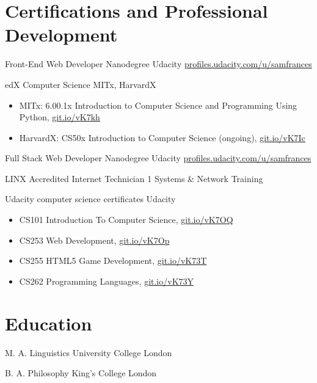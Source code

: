 \documentclass[10pt,a4paper,sans]{moderncv} %
\begin{document}

\section{Certifications and Professional Development}

    {Front-End Web Developer Nanodegree}
    {Udacity}{}
    { \href{ https://profiles.udacity.com/u/samfrances }{ profiles.udacity.com/u/samfrances } }
    {}

    {edX Computer Science}
    {MITx, HarvardX}{}
    {}
    {        \begin{itemize}
            \item{ MITx: 6.00.1x Introduction to Computer Science and Programming Using Python, \href{ https://git.io/vK7kh }{ git.io/vK7kh } }
            \item{ HarvardX: CS50x Introduction to Computer Science (ongoing), \href{ https://git.io/vK7Ic }{ git.io/vK7Ic } }
        \end{itemize}
}

    {Full Stack Web Developer Nanodegree}
    {Udacity}{}
    { \href{ https://profiles.udacity.com/u/samfrances }{ profiles.udacity.com/u/samfrances } }
    {}

    {LINX Accredited Internet Technician 1}
    {Systems \& Network Training}{}
    {}
    {}

    {Udacity computer science certificates}
    {Udacity}{}
    {}
    {        \begin{itemize}
            \item{ CS101 Introduction To Computer Science, \href{ https://git.io/vK7OQ }{ git.io/vK7OQ } }
            \item{ CS253 Web Development, \href{ https://git.io/vK7Op }{ git.io/vK7Op } }
            \item{ CS255 HTML5 Game Development, \href{ https://git.io/vK73T }{ git.io/vK73T } }
            \item{ CS262 Programming Languages, \href{ https://git.io/vK73Y }{ git.io/vK73Y } }
        \end{itemize}
}



\section{Education}

    { M. A. Linguistics}
    { University College London }{}{}{}

    { B. A. Philosophy}
    { King's College London }{}{}{}
\end{document}
